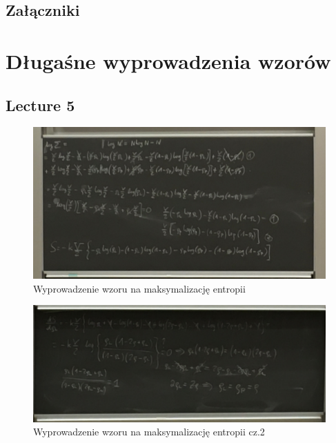 \documentclass[12pt,a4paper]{report}
\begin{document}
\begin{center}
    \chapter*{Załączniki}
\end{center}

\appendix
\setcounter{table}{0}
\captionsetup[table]{name=Załącznik}
\captionsetup[figure]{name=Załącznik}
\captionsetup[section]{name=Lecture}

\chapter{Długaśne wyprowadzenia wzorów}

\section{Lecture 5}

\begin{figure}[!ht]
    \centering
    \includegraphics[width=\linewidth]{Wyk_5_Rys_2.JPG}
    \caption{Wyprowadzenie wzoru na maksymalizację entropii}
    \label{fig:lec_5:app:maksymalizacja_entropii}
\end{figure}


\begin{figure}[!ht]
    \centering
    \includegraphics[width=\linewidth]{Wyk_5_Rys_3.JPG}
    \caption{Wyprowadzenie wzoru na maksymalizację entropii cz.2}
    \label{fig:lec_5:app:maksymalizacja_entropii_2}
\end{figure}
\end{document}
